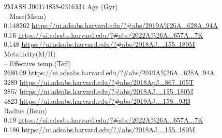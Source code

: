 2MASS J00174858-0316334
Age (Gyr)\\
--
Mass(Msun)\\
0.148262 \url{https://ui.adsabs.harvard.edu/?#abs/2019A%26A...628A..94A}\\
0.16 \url{https://ui.adsabs.harvard.edu/?#abs/2022A%26A...657A...7K}\\
0.148 \url{https://ui.adsabs.harvard.edu/?#abs/2018AJ....155..180M}\\ 
Metallicity(M/H)\\
--
Effective temp.(Teff)\\
2680.09 \url{https://ui.adsabs.harvard.edu/?#abs/2019A%26A...628A..94A}\\
3289 \url{https://ui.adsabs.harvard.edu/?#abs/2018ApJ...867..105T}\\
2857 \url{https://ui.adsabs.harvard.edu/?#abs/2018AJ....155..180M}\\
4823 \url{https://ui.adsabs.harvard.edu/?#abs/2019AJ....158...93B}\\
Radius (Rsun)\\
0.19 \url{https://ui.adsabs.harvard.edu/?#abs/2022A%26A...657A...7K}\\
0.186 \url{https://ui.adsabs.harvard.edu/?#abs/2018AJ....155..180M}\\
